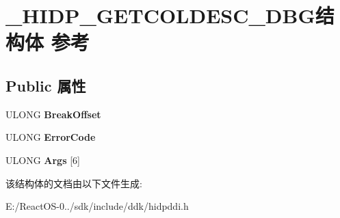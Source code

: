 \hypertarget{struct___h_i_d_p___g_e_t_c_o_l_d_e_s_c___d_b_g}{}\section{\+\_\+\+H\+I\+D\+P\+\_\+\+G\+E\+T\+C\+O\+L\+D\+E\+S\+C\+\_\+\+D\+B\+G结构体 参考}
\label{struct___h_i_d_p___g_e_t_c_o_l_d_e_s_c___d_b_g}
\subsection*{Public 属性}
\begin{DoxyCompactItemize}
\item 
\mbox{\label{struct___h_i_d_p___g_e_t_c_o_l_d_e_s_c___d_b_g_a083428cd021a26c1ee8e7a3fcccd4e5f}} 
U\+L\+O\+NG {\bfseries Break\+Offset}
\item 
\mbox{\label{struct___h_i_d_p___g_e_t_c_o_l_d_e_s_c___d_b_g_a9b3d0dd9ac725eba22fcb777847fd820}} 
U\+L\+O\+NG {\bfseries Error\+Code}
\item 
\mbox{\label{struct___h_i_d_p___g_e_t_c_o_l_d_e_s_c___d_b_g_acbe6849557516b8358301819940cb8ef}} 
U\+L\+O\+NG {\bfseries Args} \mbox{[}6\mbox{]}
\end{DoxyCompactItemize}


该结构体的文档由以下文件生成\+:\begin{DoxyCompactItemize}
\item 
E\+:/\+React\+O\+S-\/0../sdk/include/ddk/hidpddi.\+h\end{DoxyCompactItemize}
